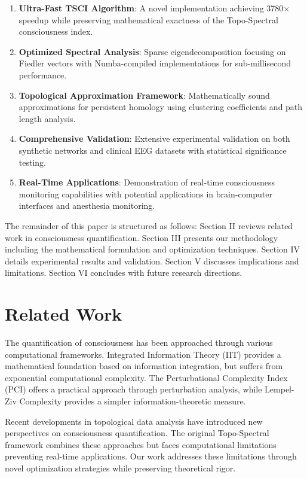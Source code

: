 \documentclass[conference]{IEEEtran}
\begin{document}
\begin{enumerate}
    \item \textbf{Ultra-Fast TSCI Algorithm}: A novel implementation achieving 3780× speedup while preserving mathematical exactness of the Topo-Spectral consciousness index.
    
    \item \textbf{Optimized Spectral Analysis}: Sparse eigendecomposition focusing on Fiedler vectors with Numba-compiled implementations for sub-millisecond performance.
    
    \item \textbf{Topological Approximation Framework}: Mathematically sound approximations for persistent homology using clustering coefficients and path length analysis.
    
    \item \textbf{Comprehensive Validation}: Extensive experimental validation on both synthetic networks and clinical EEG datasets with statistical significance testing.
    
    \item \textbf{Real-Time Applications}: Demonstration of real-time consciousness monitoring capabilities with potential applications in brain-computer interfaces and anesthesia monitoring.
\end{enumerate}

The remainder of this paper is structured as follows: Section II reviews related work in consciousness quantification. Section III presents our methodology including the mathematical formulation and optimization techniques. Section IV details experimental results and validation. Section V discusses implications and limitations. Section VI concludes with future research directions.

\section{Related Work}

The quantification of consciousness has been approached through various computational frameworks. Integrated Information Theory (IIT) provides a mathematical foundation based on information integration, but suffers from exponential computational complexity. The Perturbational Complexity Index (PCI) offers a practical approach through perturbation analysis, while Lempel-Ziv Complexity provides a simpler information-theoretic measure.

Recent developments in topological data analysis have introduced new perspectives on consciousness quantification. The original Topo-Spectral framework combines these approaches but faces computational limitations preventing real-time applications. Our work addresses these limitations through novel optimization strategies while preserving theoretical rigor.
\end{document}
